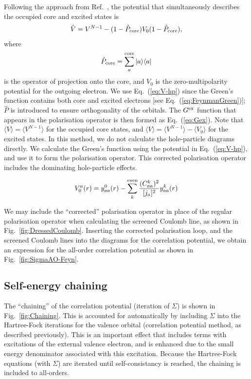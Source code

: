 \documentclass[10pt,twocolumn,a4paper]{article}%
\newcommand{\bra}[1]{\ensuremath{\langle #1|}}	%
\newcommand{\ket}[1]{\ensuremath{|#1\rangle}}	%
\newcommand{\braket}[1]{\ensuremath{\langle #1\rangle}}	%
\newcommand{\be}{\begin{equation}}
\newcommand{\ee}{\end{equation}}
\begin{document}
Following the approach from Ref.~\cite{DzubaCPM1989plaEn}, the potential that simultaneously describes the occupied core and excited states is
\be\label{eq:V-hp}
\hat V = V^{N-1} - (1-\hat P_{\rm core})V_0 (1-\hat P_{\rm core}),
\ee
where
\be
\hat P_{\rm core} = \sum_a^{\rm core}\ket{a}\bra{a}
\ee
is the operator of projection onto the core, and
 $V_0$ is the zero-multipolarity potential for the outgoing electron.
%
We use Eq.~(\ref{eq:V-hp}) since the Green's function contains both core and excited electrons [see Eq.~(\ref{eq:FeynmanGreen})]; $\hat P$ is introduced to ensure orthogonality of the orbitals.
The $G^{\rm ex}$ function that appears in the polarisation operator is then formed as Eq.~(\ref{eq:Gex}).
Note that $\braket{V}=\braket{V^{N-1}}$ for the occupied core states, and
$\braket{V}=\braket{V^{N-1}}-\braket{V_0}$ for the excited states.
In this method, we do not calculate the hole-particle diagrams directly.
We calculate the Green's function using the potential in Eq.~(\ref{eq:V-hp}), and use it to form the polarisation operator.
This corrected polarisation operator includes the dominating hole-particle effects.

\[
V_0^a(r) = y^0_{aa}(r) - \sum_k^{\rm even}\frac{(C^k_{aa})^2}{[j_a]^2}y^k_{aa}(r)
\]

We may include the ``corrected'' polarisation operator in place of the regular polarisation operator when calculating the screened Coulomb line, as shown in Fig.~\ref{fig:DressedCoulomb}.
Inserting the corrected polarisation loop, and the screened Coulomb lines into the diagrams for the correlation potential, we obtain an expression for the all-order correlation potential as shown in Fig.~\ref{fig:SigmaAO-Feyn}.







\subsection{Self-energy chaining}

The ``chaining'' of the correlation potential (iteration of $\Sigma$) is shown in Fig.~\ref{fig:Chaining}.
This is accounted for automatically by including $\Sigma$ into the Hartree-Fock iterations for the valence orbital (correlation potential method, as described previously).
This is an important effect that includes terms with excitations of the external valence electron, and is enhanced due to the small energy denominator associated with this excitation.
Because the Hartree-Fock equations (with $\Sigma$) are iterated until self-consistancy is reached, the chaining is included to all-orders.
\end{document}
